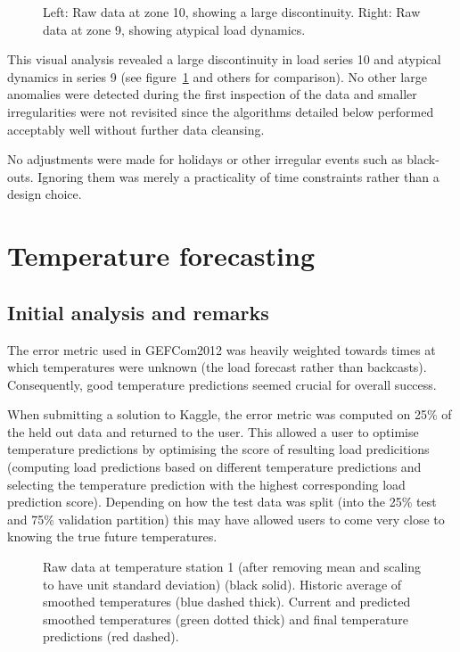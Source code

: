 \documentclass[final,authoryear,1p,times]{elsarticle}
\begin{document}
\begin{figure}[ht]
  \begin{center}
    
  \end{center}
  \caption{Left: Raw data at zone 10, showing a large discontinuity. Right: Raw data at zone 9, showing atypical load dynamics.}
  \label{fig:load}
\end{figure}

This visual analysis revealed a large discontinuity in load series 10 and atypical dynamics in series 9 (see figure~\ref{fig:load} and others for comparison).
No other large anomalies were detected during the first inspection of the data and smaller irregularities were not revisited since the algorithms detailed below performed acceptably well without further data cleansing.

No adjustments were made for holidays or other irregular events such as black-outs.
Ignoring them was merely a practicality of time constraints rather than a design choice.

\section{Temperature forecasting}

\label{sec:temp}

\subsection{Initial analysis and remarks}

The error metric used in GEFCom2012 was heavily weighted towards times at which temperatures were unknown (\ie the load forecast rather than backcasts).
Consequently, good temperature predictions seemed crucial for overall success.

When submitting a solution to Kaggle, the error metric was computed on 25\% of the held out data and returned to the user.
This allowed a user to optimise temperature predictions by optimising the score of resulting load predicitions (\ie computing load predictions based on different temperature predictions and selecting the temperature prediction with the highest corresponding load prediction score).
Depending on how the test data was split (into the 25\% test and 75\% validation partition) this may have allowed users to come very close to knowing the true future temperatures.

\begin{figure}[ht]
  \begin{center}
    
  \end{center}
  \caption{Raw data at temperature station 1 (after removing mean and scaling to have unit standard deviation) (black solid). Historic average of smoothed temperatures (blue dashed thick). Current and predicted smoothed temperatures (green dotted thick) and final temperature predictions (red dashed).}
  \label{fig:temp_pred}
\end{figure}
\end{document}
